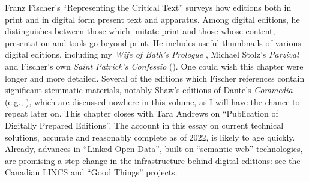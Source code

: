 \begin{review}
Franz Fischer's ``Representing the Critical Text'' surveys how
editions both in print and in digital form present text and apparatus.
Among digital editions, he distinguishes between those which imitate
print and those whose content, presentation and tools go beyond print.
He includes useful thumbnails of various digital editions, including my
\emph{Wife of Bath's Prologue} \parencite{chaucer_wife_1996}, Michael Stolz's
\emph{Parzival} \parencite{von_eschenbach_parzival-projekt_2022} and Fischer's own \emph{Saint
Patrick's Confessio} (\citeyear{harvey_saint_2011}). One could wish this chapter were longer and
more detailed. Several of the editions which Fischer references contain
significant stemmatic materials, notably Shaw's editions of Dante's
\emph{Commedia} (e.g., \citeyear{alighieri_commedia_2021}), which are discussed nowhere in this
volume, as I will have the chance to repeat later on. This chapter
closes with Tara Andrews on ``Publication of Digitally Prepared
Editions''. The account in this essay on current technical solutions,
accurate and reasonably complete as of 2022, is likely to age quickly.
Already, advances in ``Linked Open Data'', built on ``semantic web''
technologies, are promising a step-change in the infrastructure behind
digital editions: see the Canadian LINCS \parencite{brown_lincs_2020} and ``Good
Things'' \parencite{woods_good_2021} projects.


\end{review}
